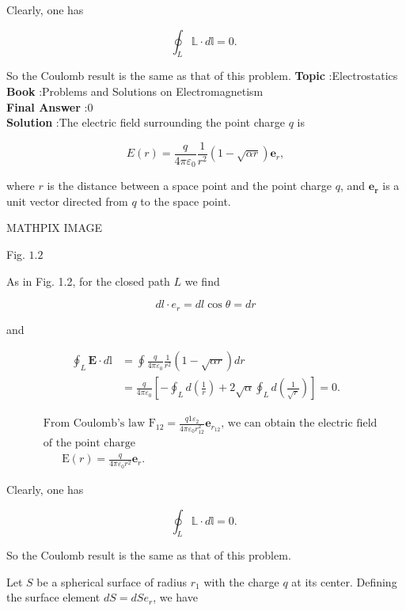 \documentclass[10pt]{article}
\begin{document}
Clearly, one has

$$
\oint_{L} \mathbb{L} \cdot d \mathbb{l}=0 \text {. }
$$

So the Coulomb result is the same as that of this problem.
\textbf{Topic} :Electrostatics\\
\textbf{Book} :Problems and Solutions on Electromagnetism\\
\textbf{Final Answer} :0\\


\textbf{Solution} :The electric field surrounding the point charge $q$ is

$$
E(r)=\frac{q}{4 \pi \varepsilon_{0}} \frac{1}{r^{2}}(1-\sqrt{\alpha r}) \mathbf{e}_{r},
$$

where $r$ is the distance between a space point and the point charge $q$, and $\mathbf{e}_{\boldsymbol{r}}$ is a unit vector directed from $q$ to the space point.

MATHPIX IMAGE

Fig. $1.2$

 As in Fig. 1.2, for the closed path $L$ we find

$$
d l \cdot e_{r}=d l \cos \theta=d r
$$

and

$$
\begin{aligned}
\oint_{L} \mathbf{E} \cdot d \mathrm{l} &=\oint \frac{q}{4 \pi \varepsilon_{0}} \frac{1}{r^{2}}(1-\sqrt{\alpha r}) d r \\
&=\frac{q}{4 \pi \varepsilon_{0}}\left[-\oint_{L} d\left(\frac{1}{r}\right)+2 \sqrt{\alpha} \oint_{L} d\left(\frac{1}{\sqrt{r}}\right)\right]=0 .
\end{aligned}
$$

$$
\begin{aligned}
&\text { From Coulomb's law } \mathrm{F}_{12}=\frac{q 1 \varepsilon_{2}}{4 \pi \varepsilon_{0} r_{12}^{2}} \mathbf{e}_{r_{12}} \text {, we can obtain the electric field } \\
&\text { of the point charge } \\
&\qquad \mathrm{E}(r)=\frac{q}{4 \pi \varepsilon_{0} r^{2}} \mathbf{e}_{r} .
\end{aligned}
$$

Clearly, one has

$$
\oint_{L} \mathbb{L} \cdot d \mathbb{l}=0 \text {. }
$$

So the Coulomb result is the same as that of this problem.

 Let $S$ be a spherical surface of radius $r_{1}$ with the charge $q$ at its center. Defining the surface element $d S=d S e_{r}$, we have
\end{document}
